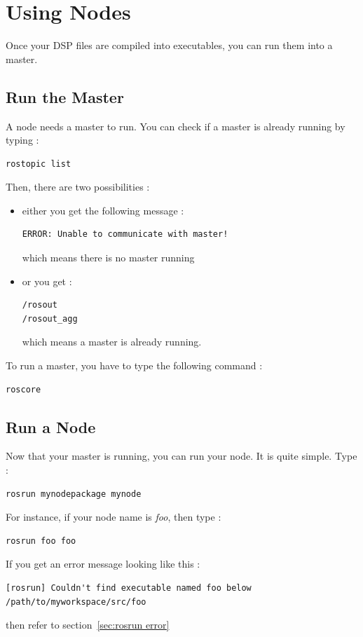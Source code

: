 \chapter{Using \faust Nodes}
\label{chap:run}
Once your DSP files are compiled into \ros executables, you can run them into a \ros master.

\section{Run the Master}
A \faust node needs a master to run. You can check if a master is already running by typing :
\begin{lstlisting}
rostopic list
\end{lstlisting}
Then, there are two possibilities :
\begin{itemize}
	\item either you get the following message :
	\begin{lstlisting}
ERROR: Unable to communicate with master!
	\end{lstlisting}
	which means there is no master running
	\item or you get :
	\begin{lstlisting}
/rosout
/rosout_agg
	\end{lstlisting}
	which means a master is already running.
\end{itemize}
To run a master, you have to type the following command :
\begin{lstlisting}
roscore
\end{lstlisting}

\newpage
\section{Run a \faust Node}
Now that your master is running, you can run your \faust node. It is quite simple. Type :
\begin{lstlisting}
rosrun mynodepackage mynode
\end{lstlisting}
For instance, if your node name is \textit{foo}, then type :
\begin{lstlisting}
rosrun foo foo
\end{lstlisting}
If you get an error message looking like this :
\begin{lstlisting}
[rosrun] Couldn't find executable named foo below /path/to/myworkspace/src/foo
\end{lstlisting}
then refer to section~\ref{sec:rosrun error}

